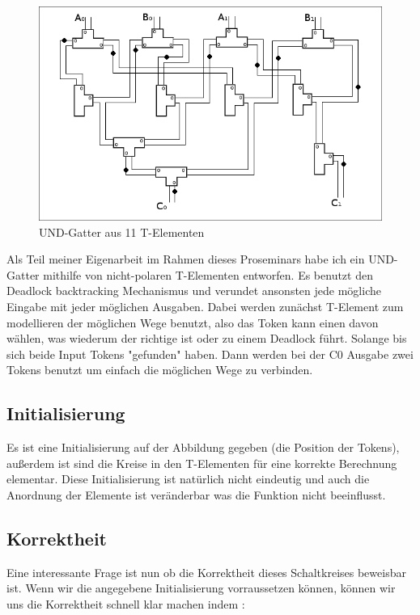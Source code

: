 \begin{figure}[h]
    \centering
    \includegraphics[width=12cm]{bilder/UndGatter.png}
    \caption{UND-Gatter aus 11 T-Elementen}
\end{figure}    


Als Teil meiner Eigenarbeit im Rahmen dieses Proseminars habe ich ein UND-Gatter
mithilfe von nicht-polaren T-Elementen entworfen.
%
Es benutzt den Deadlock backtracking Mechanismus und verundet ansonsten jede 
mögliche Eingabe mit jeder möglichen Ausgaben. 
%
Dabei werden zunächst T-Element zum modellieren der möglichen Wege benutzt, also 
das Token kann einen davon wählen, was wiederum der richtige ist oder zu einem Deadlock
führt. Solange bis sich beide Input Tokens "gefunden" haben.
%
Dann werden bei der C0 Ausgabe zwei Tokens benutzt um einfach die möglichen Wege zu 
verbinden.


\subsection{Initialisierung}
Es ist eine Initialisierung auf der Abbildung gegeben (die Position der Tokens), 
außerdem ist sind die Kreise in den T-Elementen für eine korrekte Berechnung
elementar.
%
Diese Initialisierung ist natürlich nicht eindeutig und auch die Anordnung der Elemente 
ist veränderbar was die Funktion nicht beeinflusst.

\subsection{Korrektheit}
Eine interessante Frage ist nun ob die Korrektheit dieses Schaltkreises beweisbar ist. 
Wenn wir die angegebene Initialisierung vorraussetzen können, können wir uns die 
Korrektheit schnell klar machen indem :



